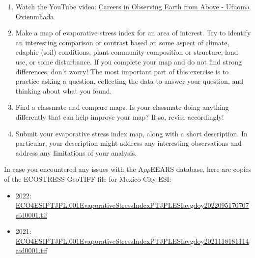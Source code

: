 \documentclass[oneside,a4paper,11pt,explicit]{book}
\begin{document}
\begin{tcolorbox}[colback=yellow!5!white,colframe=MACred,title= \vspace{.2em} \Large Make a Map Assignments]
	\large
	\begin{enumerate}
		\item Watch the YouTube video: \href{https://youtu.be/t4HI1bgeW8s}{Careers in Observing Earth from Above - Ufuoma Ovienmhada}
        \item Make a map of evaporative stress index for an area of interest. Try to identify an interesting comparison or contrast based on some aspect of climate, edaphic (soil) conditions, plant community composition or structure, land use, or some disturbance. If you complete your map and do not find strong differences, don’t worry! The most important part of this exercise is to practice asking a question, collecting the data to answer your question, and thinking about what you found. 
        \item Find a classmate and compare maps. Is your classmate doing anything differently that can help improve your map? If so, revise accordingly! 
        \item Submit your evaporative stress index map, along with a short description. In particular, your description might address any interesting observations and address any limitations of your analysis.
	\end{enumerate}
\end{tcolorbox}

\begin{tcolorbox}[colback=yellow!5!white,title=\textbf{Datafiles}]
	\large
	In case you encountered any issues with the A$\rho\rho$EEARS database, here are copies of the ECOSTRESS GeoTIFF file for Mexico City ESI:
	\begin{itemize}
		\item 2022: \href{https://jeremydforsythe.github.io/icecream-tutorials/Tutorial10_ESI/ECO4ESIPTJPL.001_Evaporative_Stress_Index_PT_JPL_ESIavg_doy2022095170707_aid0001.tif}{\small ECO4ESIPTJPL.001\textunderscore Evaporative\textunderscore Stress\textunderscore Index\textunderscore PT\textunderscore JPL\textunderscore ESIavg\textunderscore doy2022095170707\textunderscore aid0001.tif}
            \item 2021: \href{https://jeremydforsythe.github.io/icecream-tutorials/Tutorial10_ESI/ECO4ESIPTJPL.001_Evaporative_Stress_Index_PT_JPL_ESIavg_doy2021118181114_aid0001.tif}{\small ECO4ESIPTJPL.001\textunderscore Evaporative\textunderscore Stress\textunderscore Index\textunderscore PT\textunderscore JPL\textunderscore ESIavg\textunderscore doy2021118181114\textunderscore aid0001.tif}
	\end{itemize}
\end{tcolorbox}
\end{document}

